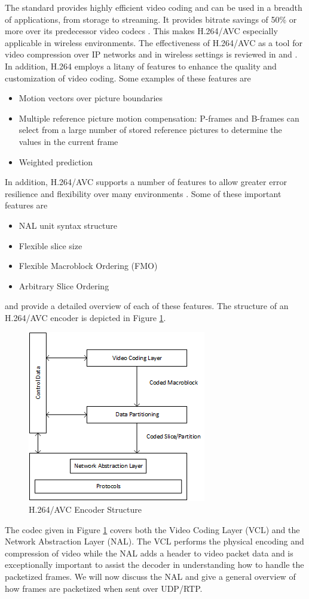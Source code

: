 \documentclass[a4paper,12pt]{article}
\begin{document}
The standard provides highly efficient video coding and can be used in a breadth of applications, from storage to streaming. It provides bitrate savings of 50\% or more over its predecessor video codecs \cite{RTP}. This makes H.264/AVC especially applicable in wireless environments. The effectiveness of H.264/AVC as a tool for video compression over IP networks and in wireless settings is reviewed  in \cite{H264OverIP} and \cite{WirelessH264}. In addition, H.264 employs a litany of features to enhance the quality and customization of video coding. Some examples of these features are 
\begin{itemize}
	\item Motion vectors over picture boundaries
	\item Multiple reference picture motion compensation: P-frames and B-frames can select from a large number of stored reference pictures to determine the values in the current frame \cite{H264AVCOverview}
	\item Weighted prediction
\end{itemize}
In addition, H.264/AVC supports a number of features to allow greater error resilience and flexibility over many environments \cite{H264AVCOverview}. Some of these important features are
\begin{itemize}
	\item NAL unit syntax structure
	\item Flexible slice size
	\item Flexible Macroblock Ordering (FMO)
	\item Arbitrary Slice Ordering
\end{itemize}
 \cite{H264AVCOverview} and \cite{H264Spec} provide a detailed overview of each of these features. The structure of an H.264/AVC encoder is depicted in Figure \ref{fig:H264EncoderStructure}.
\begin{figure}[h]
\centering
\includegraphics[width=0.4\linewidth]{H264AVCEncoderStructure.png}
\caption{H.264/AVC Encoder Structure \cite{H264AVCOverview}}
\label{fig:H264EncoderStructure}
\end{figure}
The codec given in Figure \ref{fig:H264EncoderStructure} covers both the Video Coding Layer (VCL) and the Network Abstraction Layer (NAL). The VCL performs the physical encoding and compression of video while the NAL adds a header to video packet data and is exceptionally important to assist the decoder in understanding how to handle the packetized frames. We will now discuss the NAL and give a general overview of how frames are packetized when sent over UDP/RTP. 
\end{document}

